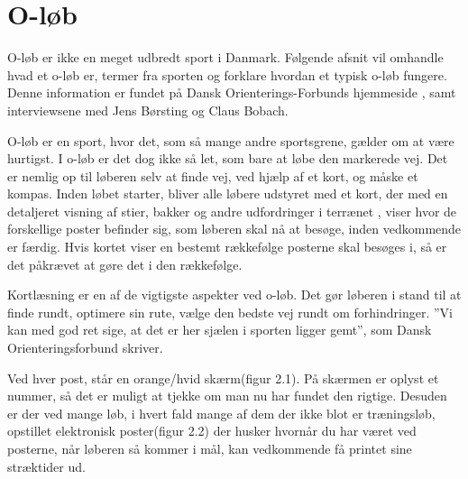 \section{O-løb}
O-løb er ikke en meget udbredt sport i Danmark. Følgende afsnit vil omhandle hvad et o-løb er, termer fra sporten og forklare hvordan et typisk o-løb fungere. Denne information er fundet på Dansk Orienterings-Forbunds hjemmeside \citep{DOF}, samt interviewsene med Jens Børsting og Claus Bobach.

O-løb er en sport, hvor det, som så mange andre sportsgrene, gælder om at være hurtigst. I o-løb er det dog ikke så let, som bare at løbe den markerede vej. Det er nemlig op til løberen selv at finde vej, ved hjælp af et kort, og måske et kompas. Inden løbet starter, bliver alle løbere udstyret med et kort, der med en detaljeret visning af stier, bakker og andre udfordringer i terrænet , viser hvor de forskellige poster befinder sig, som løberen skal nå at besøge, inden vedkommende er færdig. Hvis kortet viser en bestemt rækkefølge posterne skal besøges i, så er det påkrævet at gøre det i den rækkefølge. 

Kortlæsning er en af de vigtigste aspekter ved o-løb. Det gør løberen i stand til at finde rundt, optimere sin rute, vælge den bedste vej rundt om forhindringer. ”Vi kan med god ret sige, at det er her sjælen i sporten ligger gemt”, som Dansk Orienteringsforbund skriver.   

Ved hver post, står en  orange/hvid skærm(figur 2.1). På skærmen er oplyst et nummer, så det er muligt at tjekke om man nu har fundet den rigtige. Desuden er der ved mange løb, i hvert fald mange af dem der ikke blot er træningsløb, opstillet elektronisk poster(figur 2.2) der husker hvornår du har været ved posterne, når løberen så kommer i mål, kan vedkommende få printet sine stræktider ud.

